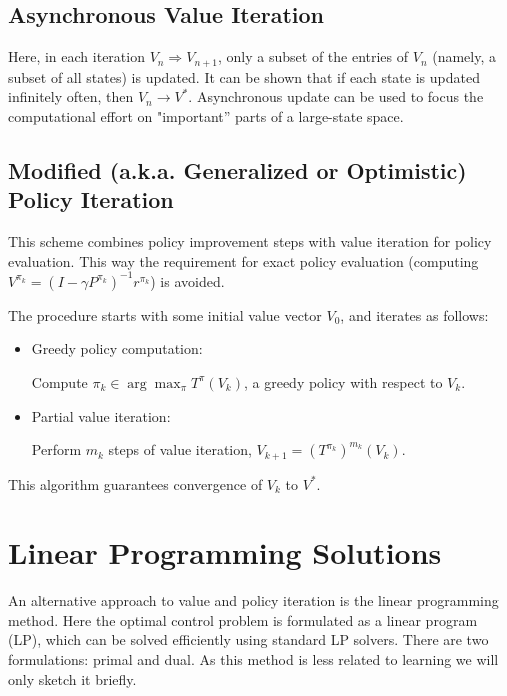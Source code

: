 \subsection{Asynchronous Value  Iteration}
Here, in each iteration ${V_n} \Rightarrow {V_{n + 1}}$, only a subset of the entries of  ${V_n}$ (namely, a subset of all states) is updated.
It can be shown that if each state is updated infinitely often, then ${V_n} \to {V^*}$.
Asynchronous update can be used to focus the computational effort on "important'' parts of a large-state space.



\subsection{Modified (a.k.a. Generalized or Optimistic) Policy Iteration}\label{ss:mod_PI}

This scheme combines policy improvement steps with value iteration for policy evaluation. This way the requirement for exact policy evaluation (computing  ${V^{{\pi _k}}} = {(I - \gamma {P^{{\pi _k}}})^{ - 1}}{r^{{\pi _k}}}$) is avoided.

The procedure starts with some initial value vector ${V_0}$, and iterates as follows:
\begin{itemize}
  \item Greedy policy computation:

Compute ${\pi _k} \in \arg {\max _\pi }T_{}^\pi ({V_k})$, a greedy policy with respect to ${V_k}$.
  \item Partial value iteration:

Perform ${m_k}$ steps of value iteration, ${V_{k + 1}} = {(T_{}^{{\pi _k}})^{{m_k}}}({V_k})$.
\end{itemize}

This algorithm guarantees convergence of ${V_k}$ to ${V^*}$.

\section{Linear Programming Solutions}

An alternative approach to value and policy iteration is the linear programming method. Here the optimal control problem is formulated as a linear program (LP), which can be solved efficiently using standard LP solvers. There are two formulations: primal and dual. As this method is less related to learning we will only sketch it briefly.

